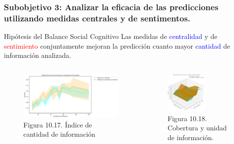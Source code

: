 \documentclass{beamer}
\begin{document}
\begin{frame}
	\frametitle{Subobjetivo 3: Analizar la eficacia de las predicciones utilizando medidas centrales y de sentimentos.}
\begin{block}{Hipótesis del Balance Social Cognitivo}
Las medidas de \textcolor{blue}{centralidad} y de \textcolor{red}{sentimiento} conjuntamente mejoran la predicción cuanto mayor \textcolor{blue}{cantidad} de información analizada.

\end{block}	
	\begin{columns}[c]
		\begin{column}{.5\textwidth}
			\begin{figure}
				\centering
				\includegraphics[width=1\textwidth]{figs/cap7/figura_55}
				\caption{Figura 10.17. Índice de cantidad de información}
			\end{figure}      
		\end{column}
		\begin{column}{.5\textwidth}
			\begin{figure}
				\centering
				\includegraphics[width=0.60\textwidth]{figs/cap7/figura_56}
			\caption{Figura 10.18. Cobertura y unidad de información.}
			\end{figure}
		\end{column}
	\end{columns}
	
\end{frame}
\end{document}
